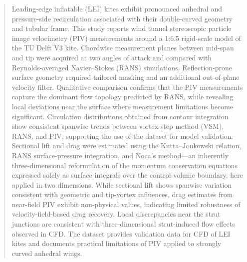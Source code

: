 \documentclass[wes, manuscript]{copernicus}
\begin{document}
\begin{abstract}
%
Leading-edge inflatable (LEI) kites exhibit pronounced anhedral and pressure-side recirculation associated with their double-curved geometry and tubular frame. This study reports wind tunnel stereoscopic particle image velocimetry (PIV) measurements around a 1:6.5 rigid-scale model of the TU Delft V3 kite. Chordwise measurement planes between mid-span and tip were acquired at two angles of attack and compared with Reynolds-averaged Navier--Stokes (RANS) simulations. Reflection-prone surface geometry required tailored masking and an additional out-of-plane velocity filter. Qualitative comparison confirms that the PIV measurements capture the dominant flow topology predicted by RANS, while revealing local deviations near the surface where measurement limitations become significant. Circulation distributions obtained from contour integration show consistent spanwise trends between vortex-step method (VSM), RANS, and PIV, supporting the use of the dataset for model validation. Sectional lift and drag were estimated using the Kutta--Joukowski relation, RANS surface-pressure integration, and Noca's method—an inherently three-dimensional reformulation of the momentum conservation equations expressed solely as surface integrals over the control-volume boundary, here applied in two dimensions. While sectional lift shows spanwise variation consistent with geometric and tip-vortex influences, drag estimates from near-field PIV exhibit non-physical values, indicating limited robustness of velocity-field-based drag recovery. Local discrepancies near the strut junctions are consistent with three-dimensional strut-induced flow effects observed in CFD. The dataset provides validation data for CFD of LEI kites and documents practical limitations of PIV applied to strongly curved anhedral wings.
%
\end{abstract}
%
\end{document}
